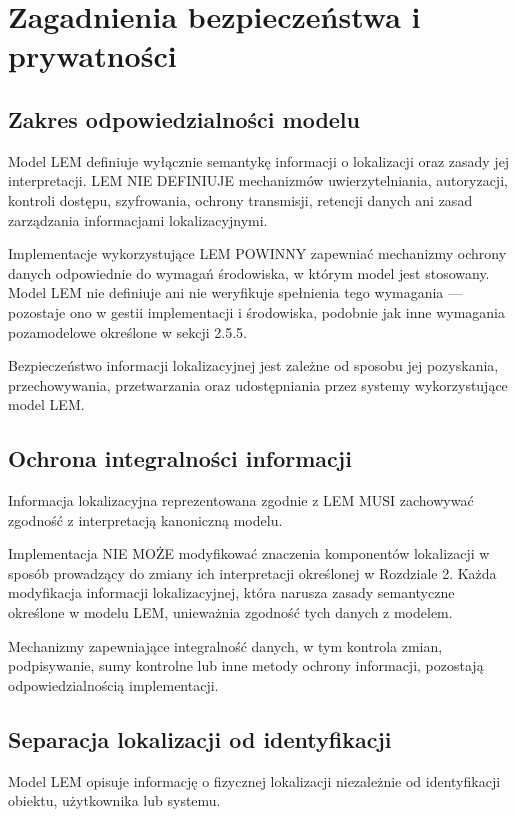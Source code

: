 
\chapter{Zagadnienia bezpieczeństwa i prywatności}
\label{chap:bezpieczenstwo}

\section{Zakres odpowiedzialności modelu}
Model LEM definiuje wyłącznie semantykę informacji o lokalizacji oraz zasady jej interpretacji. LEM NIE DEFINIUJE mechanizmów uwierzytelniania, autoryzacji, kontroli dostępu, szyfrowania, ochrony transmisji, retencji danych ani zasad zarządzania informacjami lokalizacyjnymi.

Implementacje wykorzystujące LEM POWINNY zapewniać mechanizmy ochrony danych odpowiednie do wymagań środowiska, w którym model jest stosowany. Model LEM nie definiuje ani nie weryfikuje spełnienia tego wymagania — pozostaje ono w gestii implementacji i środowiska, podobnie jak inne wymagania pozamodelowe określone w sekcji 2.5.5.

Bezpieczeństwo informacji lokalizacyjnej jest zależne od sposobu jej pozyskania, przechowywania, przetwarzania oraz udostępniania przez systemy wykorzystujące model LEM.

\section{Ochrona integralności informacji}
Informacja lokalizacyjna reprezentowana zgodnie z LEM MUSI zachowywać zgodność z interpretacją kanoniczną modelu.

Implementacja NIE MOŻE modyfikować znaczenia komponentów lokalizacji w sposób prowadzący do zmiany ich interpretacji określonej w Rozdziale 2. Każda modyfikacja informacji lokalizacyjnej, która narusza zasady semantyczne określone w modelu LEM, unieważnia zgodność tych danych z modelem.

Mechanizmy zapewniające integralność danych, w tym kontrola zmian, podpisywanie, sumy kontrolne lub inne metody ochrony informacji, pozostają odpowiedzialnością implementacji.

\section{Separacja lokalizacji od identyfikacji}
Model LEM opisuje informację o fizycznej lokalizacji niezależnie od identyfikacji obiektu, użytkownika lub systemu.

